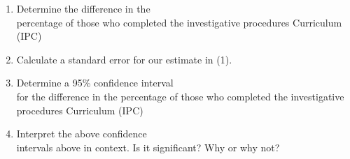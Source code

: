 \documentclass[11pt]{book}\usepackage[]{graphicx}\usepackage[]{color}
\begin{document}
\begin{exercises}
\begin{exercise}
\begin{enumerate}
\item Determine the difference in the \\ percentage of those who completed the investigative procedures Curriculum \\ (IPC)

\item Calculate a standard error for our estimate in (1).

\item Determine a 95\% confidence interval \\ for the difference in the percentage of those who completed the investigative procedures Curriculum (IPC)

\item Interpret the above confidence \\ intervals above in context.  Is it significant? Why or why not?


\end{enumerate}

	\end{exercise}
%
%
%


\end{exercises}
\end{document}

